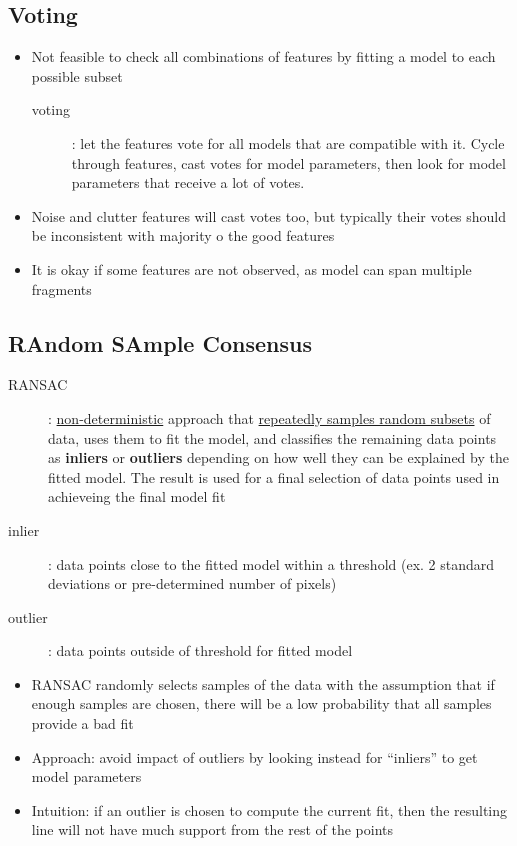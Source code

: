 \documentclass[letterpaper,12pt]{article}
\begin{document}
\subsection{Voting}
\begin{itemize}
 \item Not feasible to check all combinations of features by fitting a model to each possible subset
       \begin{description}
        \item[voting]: let the features vote for all models that are compatible with it. Cycle through features, cast votes for model parameters, then look for model parameters that receive a lot of votes.
       \end{description}
 \item Noise and clutter features will cast votes too, but typically their votes should be inconsistent with majority o the good features
 \item It is okay if some features are not observed, as model can span multiple fragments
\end{itemize}


\subsection{RAndom SAmple Consensus}
\begin{description}
 \item[RANSAC]: \underline{non-deterministic} approach that \underline{repeatedly samples random subsets} of data, uses them to fit the model, and classifies the remaining data points as \textbf{inliers} or \textbf{outliers} depending on how well they can be explained by the fitted model. The result is used for a final selection of data points used in achieveing the final model fit
 \item[inlier]: data points close to the fitted model within a threshold (ex. 2 standard deviations or pre-determined number of pixels)
 \item[outlier]: data points outside of threshold for fitted model
\end{description}
\begin{itemize}
 \item RANSAC randomly selects samples of the data with the assumption that if enough samples are chosen, there will be a low probability that all samples provide a bad fit
 \item Approach: avoid impact of outliers by looking instead for ``inliers'' to get model parameters
 \item Intuition: if an outlier is chosen to compute the current fit, then the resulting line will not have much support from the rest of the points
\end{itemize}
\end{document}
